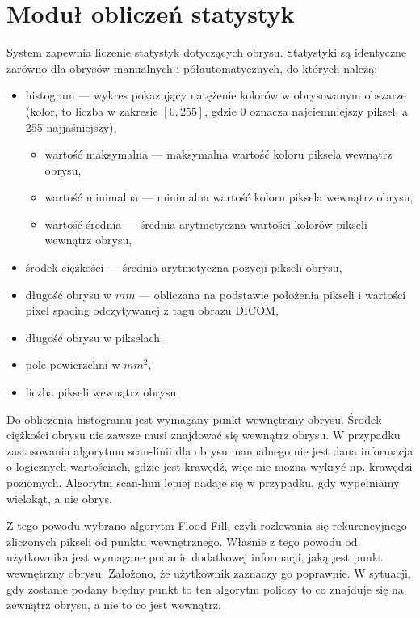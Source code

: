 \documentclass[a4paper,11pt,twoside,openright]{report}
\theoremstyle{definition}
\begin{document}
\section {Moduł obliczeń statystyk}

System zapewnia liczenie statystyk dotyczących obrysu. Statystyki są identyczne
zarówno dla obrysów manualnych i półautomatycznych, do których należą:

\begin{itemize}[noitemsep]
\item histogram --- wykres pokazujący natężenie kolorów w obrysowanym obszarze
(kolor, to liczba w zakresie $[0,255]$, gdzie 0 oznacza najciemniejszy piksel,
a 255 najjaśniejszy),
\begin{itemize}[noitemsep]
\item wartość maksymalna --- maksymalna wartość koloru piksela wewnątrz obrysu,
\item wartość minimalna --- minimalna wartość koloru piksela wewnątrz obrysu,
\item wartość średnia --- średnia arytmetyczna wartości kolorów pikseli wewnątrz obrysu,
\end{itemize}
\item środek ciężkości --- średnia arytmetyczna pozycji pikseli obrysu,
\item długość obrysu w $mm$ --- obliczana na podstawie położenia pikseli i
wartości pixel spacing odczytywanej z tagu obrazu DICOM,
\item długość obrysu w pikselach,
\item pole powierzchni w $mm^2$,
\item liczba pikseli wewnątrz obrysu.
\end{itemize}

Do obliczenia histogramu jest wymagany punkt wewnętrzny obrysu. Środek ciężkości
obrysu nie zawsze musi znajdować się wewnątrz obrysu. W przypadku zastosowania
algorytmu scan-linii dla obrysu manualnego nie jest dana informacja o logicznych
wartościach, gdzie jest krawędź, więc nie można wykryć np. krawędzi poziomych.
Algorytm scan-linii lepiej nadaje się w przypadku, gdy wypełniamy wielokąt,
a nie obrys.

Z tego powodu wybrano algorytm Flood Fill, czyli rozlewania się rekurencyjnego
zliczonych pikseli od punktu wewnętrznego. Właśnie z tego powodu od użytkownika
jest wymagane podanie dodatkowej informacji, jaką jest punkt wewnętrzny obrysu.
Założono, że użytkownik zaznaczy go poprawnie. W sytuacji, gdy zostanie podany
błędny punkt to ten algorytm policzy to co znajduje się na zewnątrz obrysu, a
nie to co jest wewnątrz.
\end{document}
